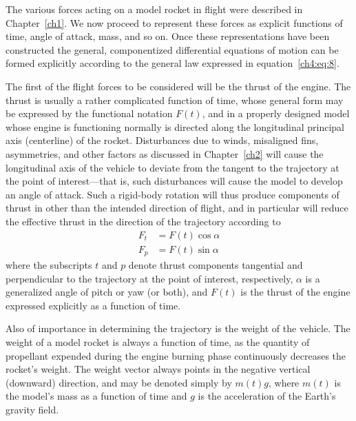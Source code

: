 The various forces acting on a model rocket in flight were described in Chapter~\ref{ch1}. We now
proceed to represent these forces as explicit functions of time, angle of attack, mass, and so on.
Once these representations have been constructed the general, componentized differential equations
of motion can be formed explicitly according to the general law expressed in
equation~\eqref{ch4:eq:8}.

The first of the flight forces to be considered will be the thrust of the engine. The thrust is
usually a rather complicated function of time, whose general form may be expressed by the
functional notation $F(t)$, and in a properly designed model whose engine is functioning normally
is directed along the longitudinal principal axis (centerline) of the rocket. Disturbances due to
winds, misaligned fins, asymmetries, and other factors as discussed in Chapter~\ref{ch2} will cause
the longitudinal axis of the vehicle to deviate from the tangent to the trajectory at the point of
interest---that is, such disturbances will cause the model to develop an angle of attack. Such a
rigid-body rotation will thus produce components of thrust in other than the intended direction of
flight, and in particular will reduce the effective thrust in the direction of the trajectory
according to
\begin{align}
F_t &= F(t)\cos\alpha \label{ch4:eq:9}\\
F_p &= F(t)\sin\alpha \label{ch4:eq:10}
\end{align}
where the subscripts $t$ and $p$ denote thrust components tangential and perpendicular to the
trajectory at the point of interest, respectively, $\alpha$ is a generalized angle of pitch or yaw
(or both), and $F(t)$ is the thrust of the engine expressed explicitly as a function of time.

Also of importance in determining the trajectory is the weight of the vehicle. The weight of a
model rocket is always a function of time, as the quantity of propellant expended during the engine
burning phase continuously decreases the rocket's weight. The weight vector always points in the
negative vertical (downward) direction, and may be denoted simply by $m(t)g$, where $m(t)$ is the
model's mass as a function of time and $g$ is the acceleration of the Earth's gravity field.

